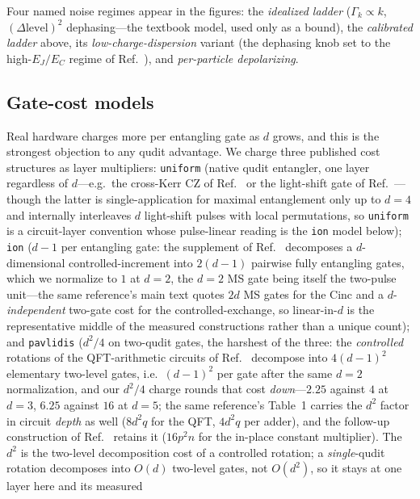 \documentclass[aps,pra,reprint,superscriptaddress,nofootinbib,floatfix]{revtex4-2}
\begin{document}
Four named noise regimes appear in the figures: the \emph{idealized
ladder} ($\Gamma_k\propto k$, $(\Delta\mathrm{level})^2$ dephasing---the
textbook model, used only as a bound), the \emph{calibrated ladder}
above, its \emph{low-charge-dispersion} variant (the dephasing knob set
to the high-$E_J/E_C$ regime of Ref.~\cite{wang2025}), and
\emph{per-particle depolarizing}.

\subsection{Gate-cost models}

Real hardware charges more per entangling gate as $d$ grows, and this is
the strongest objection to any qudit advantage. We charge three
published cost structures as layer multipliers: \texttt{uniform} (native
qudit entangler, one layer regardless of $d$---e.g.\ the cross-Kerr CZ
of Ref.~\cite{goss2022} or the light-shift gate of
Ref.~\cite{hrmo2023}---though the latter is single-application for
maximal entanglement only up to $d=4$ and internally interleaves $d$
light-shift pulses with local permutations, so \texttt{uniform} is a
circuit-layer convention whose pulse-linear reading is the
\texttt{ion} model below); \texttt{ion} ($d-1$ per entangling gate: the
supplement of Ref.~\cite{ringbauer2022} decomposes a $d$-dimensional
controlled-increment into $2(d{-}1)$ pairwise fully entangling gates,
which we normalize to $1$ at $d=2$, the $d{=}2$ MS gate being itself
the two-pulse unit---the same reference's main text quotes $2d$ MS
gates for the Cinc and a $d$-\emph{independent} two-gate cost for the
controlled-exchange, so linear-in-$d$ is the representative middle of
the measured constructions rather than a unique count); and
\texttt{pavlidis} ($d^2/4$ on
two-qudit gates, the harshest of the three: the \emph{controlled}
rotations of the
QFT-arithmetic circuits of Ref.~\cite{pavlidis2021} decompose into
$4(d-1)^2$ elementary two-level gates, i.e.\ $(d-1)^2$ per gate after
the same $d=2$ normalization, and our $d^2/4$ charge rounds that cost
\emph{down}---$2.25$ against $4$ at $d=3$, $6.25$ against $16$ at
$d=5$; the same reference's Table~1 carries the $d^2$ factor in
circuit \emph{depth} as well ($8d^2q$ for the QFT, $4d^2q$ per
adder), and the follow-up construction of Ref.~\cite{floratos2024}
retains it ($16p^2n$ for the in-place constant multiplier). The
$d^2$ is the two-level decomposition cost of a controlled rotation;
a \emph{single}-qudit rotation decomposes into $O(d)$ two-level
gates, not $O(d^2)$, so it stays at one layer here and its measured
\end{document}
